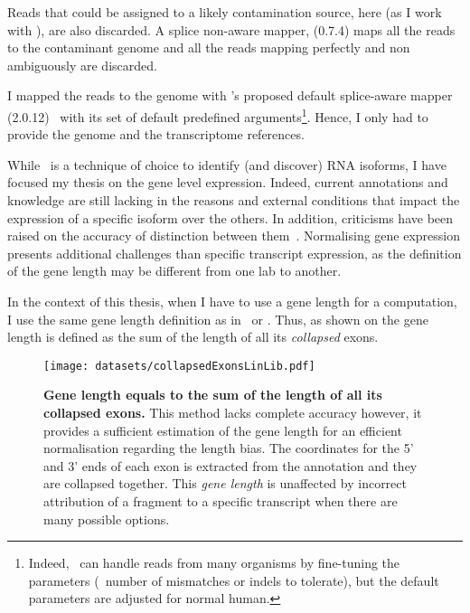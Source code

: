 Reads that could be assigned to a likely contamination source, here
 (as I work with ),
are also discarded. A splice non-aware mapper,
 (0.7.4) maps all the reads to the
contaminant genome and all the reads mapping perfectly and non ambiguously are
discarded.

I mapped the reads to the genome with \irap's proposed default splice-aware mapper
(2.0.12)~
with its set of default predefined arguments\footnote{Indeed, \toph\ can
handle reads from many organisms by fine-tuning the parameters (\eg\ number
of mismatches or indels to tolerate), but the default parameters are adjusted
for normal human.}. Hence, I only had to provide the
genome and the transcriptome references.


While \Rnaseq\ is a technique of choice to identify (and discover) \gls{RNA}
isoforms, I have focused my thesis on the gene level expression. Indeed, current
annotations and knowledge are still lacking in the reasons and
external conditions that impact the expression of a specific isoform over the
others. In addition, criticisms have been raised on the accuracy of distinction
between them~. Normalising gene expression
presents additional challenges than specific transcript expression,
as the definition of the gene length may be different from one lab to another.

In the context of this thesis, when I have to use a gene length for a computation,
I use the same gene length definition as in
\irap\ or \egxa. Thus, as shown on  the gene
length is defined as the sum of the length of all its \emph{collapsed} exons.

\begin{figure}
    \texttt{[image: datasets/collapsedExonsLinLib.pdf]}\centering
        \caption[Gene length equals to the sum of the length of all its collapsed
        exons]{\label{fig:Genelength-collapsedExons}\textbf{Gene length equals to
        the sum of the length of all its collapsed exons.} This method lacks
        complete accuracy however, it provides a sufficient estimation of the
        gene length for an efficient normalisation regarding the length bias.
        The coordinates for the 5' and 3' ends of each exon is extracted from
        the annotation and they are collapsed together. This \emph{gene length}
        is unaffected by incorrect attribution of a fragment to a
        specific transcript when there are many possible options.}
    \end{figure}

